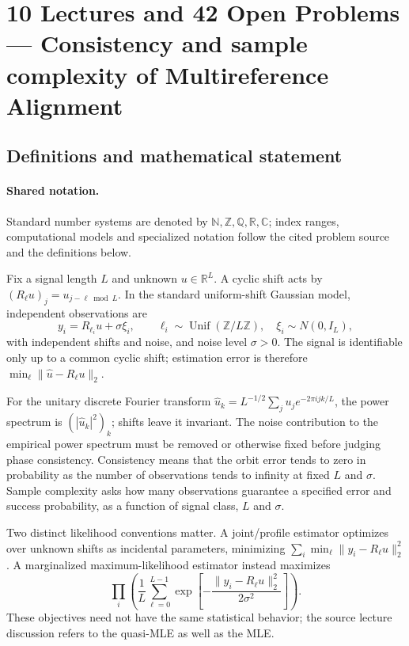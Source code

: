 \documentclass[11pt]{article}
\begin{document}
\section{10 Lectures and 42 Open Problems — Consistency and sample complexity of Multireference Alignment}\label{statement}

\subsection{Definitions and mathematical statement}

\paragraph{Shared notation.}Standard number systems are denoted by $\mathbb N,\mathbb Z,\mathbb Q,\mathbb R,\mathbb C$; index ranges, computational models and specialized notation follow the cited problem source and the definitions below.


Fix a signal length $L$ and unknown $u\in\mathbb{R}^L$. A cyclic shift acts by $(R_\ell u)_j=u_{j-\ell\bmod L}$. In the standard uniform-shift Gaussian model, independent observations are
\[
 y_i=R_{\ell_i}u+\sigma\xi_i,\qquad
 \ell_i\sim\operatorname{Unif}(\mathbb{Z}/L\mathbb{Z}),\quad
 \xi_i\sim N(0,I_L),
\]
with independent shifts and noise, and noise level $\sigma>0$. The signal is identifiable only up to a common cyclic shift; estimation error is therefore $\min_\ell\|\widehat u-R_\ell u\|_2$.

For the unitary discrete Fourier transform $\widehat u_k=L^{-1/2}\sum_j u_j e^{-2\pi i jk/L}$, the power spectrum is $(|\widehat u_k|^2)_k$; shifts leave it invariant. The noise contribution to the empirical power spectrum must be removed or otherwise fixed before judging phase consistency. Consistency means that the orbit error tends to zero in probability as the number of observations tends to infinity at fixed $L$ and $\sigma$. Sample complexity asks how many observations guarantee a specified error and success probability, as a function of signal class, $L$ and $\sigma$.

Two distinct likelihood conventions matter. A joint/profile estimator optimizes over unknown shifts as incidental parameters, minimizing $\sum_i\min_\ell\|y_i-R_\ell u\|_2^2$. A marginalized maximum-likelihood estimator instead maximizes
\[
 \prod_i\left(\frac1L\sum_{\ell=0}^{L-1}
 \exp\left[-\frac{\|y_i-R_\ell u\|_2^2}{2\sigma^2}\right]\right).
\]
These objectives need not have the same statistical behavior; the source lecture discussion refers to the quasi-MLE as well as the MLE.
\end{document}
